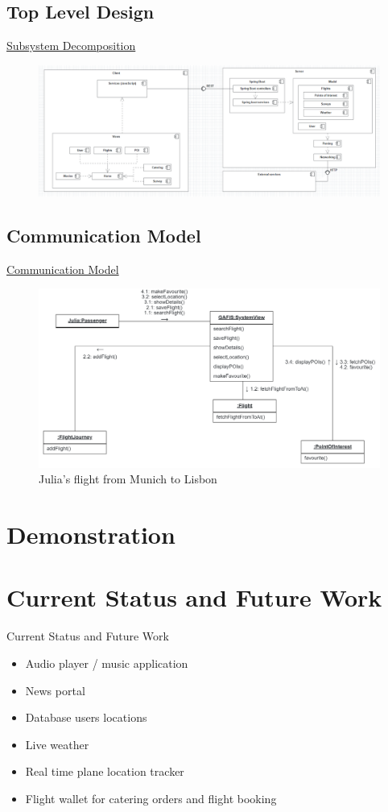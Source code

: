 \documentclass{beamer}
\begin{document}
\subsection{Top Level Design}
\begin{frame}{\href{run:../images/SubsystemDecomposition.PNG}{Subsystem Decomposition}}
	\begin{figure}
		\includegraphics[width=\textwidth]{../images/SubsystemDecomposition.PNG}
	\end{figure}
\end{frame}
\subsection{Communication Model}
\begin{frame}{\href{run:../images/ScenarioOneCommunication.png}{Communication Model}}
	\begin{figure}
		\includegraphics[width=.8\textwidth]{../images/ScenarioOneCommunication.png}
		\caption{Julia's flight from Munich to Lisbon}
	\end{figure}
\end{frame}
\section{Demonstration}
\section{Current Status and Future Work}
\begin{frame}{Current Status and Future Work}
	\begin{itemize}
		\item Audio player / music application
		\item News portal
		\item Database users locations
		\item Live weather
		\item Real time plane location tracker
		\item Flight wallet for catering orders and flight booking
	\end{itemize}
\end{frame}
\end{document}
